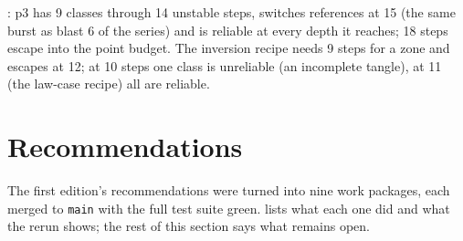 \documentclass[11pt,a4paper]{article}
\newcommand{\code}[1]{\texttt{#1}}
\begin{document}
: p3 has 9 classes through 14 unstable steps, switches
references at 15 (the same burst as blast 6 of the series) and is reliable
at every depth it reaches; 18 steps escape into the point budget. The
inversion recipe needs 9 steps for a zone and escapes at 12; at 10 steps one
class is unreliable (an incomplete tangle), at 11 (the law-case recipe) all
are reliable.

\section{Recommendations}
\label{sec:recs}

The first edition's recommendations were turned into nine work packages,
each merged to \code{main} with the full test suite green. 
lists what each one did and what the rerun shows; the rest of this section
says what remains open.
\end{document}
